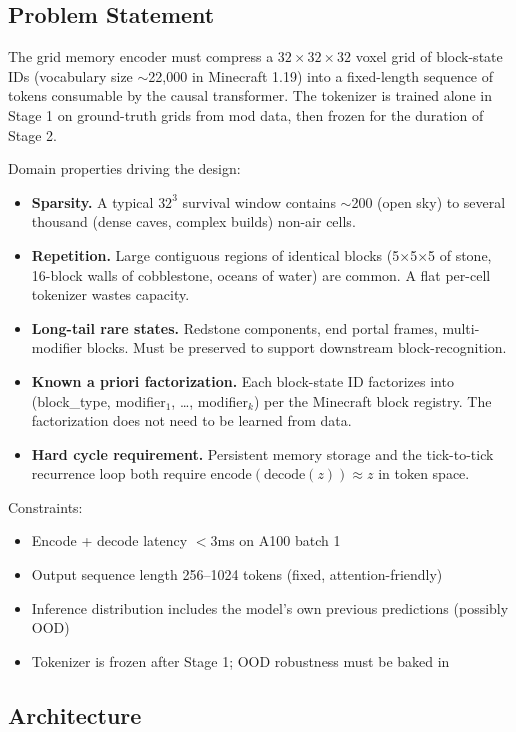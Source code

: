 \documentclass[11pt,a4paper]{article}
\begin{document}
\subsection{Problem Statement}

The grid memory encoder must compress a $32 \times 32 \times 32$ voxel grid of block-state IDs (vocabulary size $\sim$22{,}000 in Minecraft 1.19) into a fixed-length sequence of tokens consumable by the causal transformer. The tokenizer is trained alone in Stage 1 on ground-truth grids from mod data, then frozen for the duration of Stage 2.

Domain properties driving the design:
\begin{itemize}
  \item \textbf{Sparsity.} A typical $32^3$ survival window contains $\sim$200 (open sky) to several thousand (dense caves, complex builds) non-air cells.
  \item \textbf{Repetition.} Large contiguous regions of identical blocks (5$\times$5$\times$5 of stone, 16-block walls of cobblestone, oceans of water) are common. A flat per-cell tokenizer wastes capacity.
  \item \textbf{Long-tail rare states.} Redstone components, end portal frames, multi-modifier blocks. Must be preserved to support downstream block-recognition.
  \item \textbf{Known a priori factorization.} Each block-state ID factorizes into (block\_type, modifier$_1$, \ldots, modifier$_k$) per the Minecraft block registry. The factorization does not need to be learned from data.
  \item \textbf{Hard cycle requirement.} Persistent memory storage and the tick-to-tick recurrence loop both require $\text{encode}(\text{decode}(z)) \approx z$ in token space.
\end{itemize}

Constraints:
\begin{itemize}
  \item Encode + decode latency $<$3ms on A100 batch 1
  \item Output sequence length 256--1024 tokens (fixed, attention-friendly)
  \item Inference distribution includes the model's own previous predictions (possibly OOD)
  \item Tokenizer is frozen after Stage 1; OOD robustness must be baked in
\end{itemize}

\subsection{Architecture}
\end{document}
